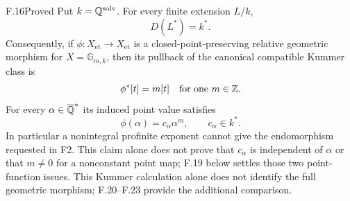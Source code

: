 \begin{claim}{F.16}{Proved}
Put $k=\mathbb Q^{\mathrm{solv}}$. For every finite extension $L/k$,
\[
 D(L^*)=k^*.
\]
Consequently, if $\phi:X_{\mathrm{et}}\to X_{\mathrm{et}}$ is a
closed-point-preserving relative geometric morphism for
$X=\mathbb G_{m,k}$, then its pullback of the canonical compatible
Kummer class is
\[
 \phi^*[t]=m[t]\quad\text{for one }m\in\mathbb Z.
\]
For every $\alpha\in\overline{\mathbb Q}^*$ its induced point value satisfies
\[
 \phi(\alpha)=c_\alpha\alpha^m,
 \qquad c_\alpha\in k^*.
\]
In particular a nonintegral profinite exponent cannot give the
endomorphism requested in F2. This claim alone does not prove that $c_\alpha$ is independent of
$\alpha$ or that $m\ne0$ for a nonconstant point map; F.19 below
settles those two point-function issues. This Kummer calculation
alone does not identify the full geometric morphism; F.20--F.23
provide the additional comparison.
\end{claim}
